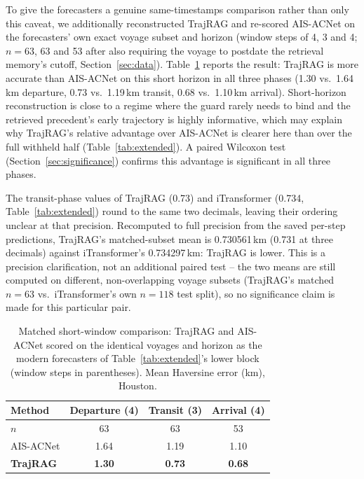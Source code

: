 To give the forecasters a genuine same-timestamps comparison rather than
only this caveat, we additionally reconstructed TrajRAG and re-scored
AIS-ACNet on the forecasters' own exact voyage subset and horizon (window
steps of 4, 3 and 4; $n=63$, 63 and 53 after also requiring the voyage to
postdate the retrieval memory's cutoff, Section~\ref{sec:data}).
Table~\ref{tab:item4-matched} reports the result: TrajRAG is more accurate
than AIS-ACNet on this short horizon in all three phases (1.30 vs.\
1.64\,km departure, 0.73 vs.\ 1.19\,km transit, 0.68 vs.\ 1.10\,km arrival).
Short-horizon reconstruction is close to a regime where the guard rarely
needs to bind and the retrieved precedent's early trajectory is highly
informative, which may explain why TrajRAG's relative advantage over
AIS-ACNet is clearer here than over the full withheld half (Table~\ref{tab:extended}).
A paired Wilcoxon test (Section~\ref{sec:significance}) confirms this
advantage is significant in all three phases.

The transit-phase values of TrajRAG (0.73) and iTransformer (0.734,
Table~\ref{tab:extended}) round to the same two decimals, leaving their
ordering unclear at that precision. Recomputed to full precision from the
saved per-step predictions, TrajRAG's matched-subset mean is
0.730561\,km (0.731 at three decimals) against iTransformer's
0.734297\,km: TrajRAG is lower. This is a precision clarification, not an
additional paired test -- the two means are still computed on different,
non-overlapping voyage subsets (TrajRAG's matched $n=63$ vs.\
iTransformer's own $n=118$ test split), so no significance claim is made
for this particular pair.

\begin{table}[t]
\centering
\caption{Matched short-window comparison: TrajRAG and AIS-ACNet scored on
the identical voyages and horizon as the modern forecasters of
Table~\ref{tab:extended}'s lower block (window steps in parentheses).
Mean Haversine error (km), Houston.}
\label{tab:item4-matched}
\footnotesize
\begin{tabular}{lccc}
\toprule
Method & Departure (4) & Transit (3) & Arrival (4) \\
\midrule
$n$ & 63 & 63 & 53 \\
AIS-ACNet & 1.64 & 1.19 & 1.10 \\
\textbf{TrajRAG} & \textbf{1.30} & \textbf{0.73} & \textbf{0.68} \\
\bottomrule
\end{tabular}
\end{table}

